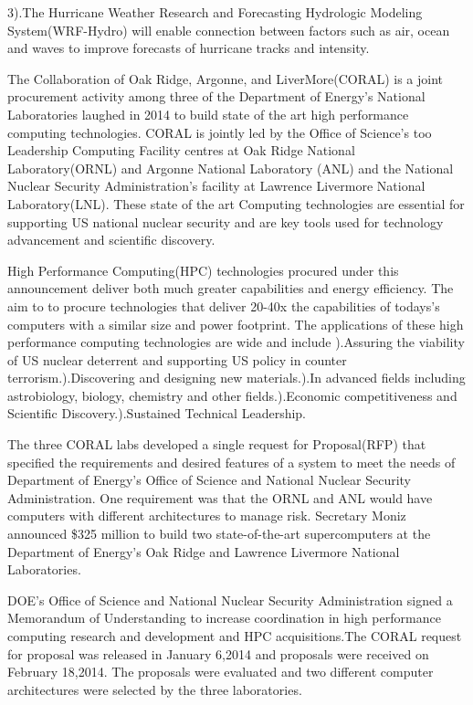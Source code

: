 \documentclass[fleqn,letterpaper,12pt]{report}
\begin{document}
3).The Hurricane Weather Research and Forecasting Hydrologic Modeling System(WRF-Hydro) will enable connection between factors such as air, ocean and waves to improve forecasts of hurricane tracks and intensity.
%
\newpage
{}
{}
\problem
The Collaboration of Oak Ridge, Argonne, and LiverMore(CORAL) is a joint procurement activity among three of the Department of Energy’s National Laboratories laughed in 2014 to build state of the art high performance computing technologies. CORAL is jointly led by the Office of Science’s too Leadership Computing Facility centres at Oak Ridge National Laboratory(ORNL) and Argonne  National Laboratory (ANL) and the National Nuclear Security Administration’s facility at Lawrence Livermore National Laboratory(LNL). These state of the art Computing technologies are essential for supporting US national nuclear security and are key tools used for technology advancement and scientific discovery.

High Performance Computing(HPC) technologies procured under this announcement deliver both much greater capabilities and energy efficiency. The aim to to procure technologies that deliver 20-40x the capabilities of todays’s computers with a similar size and power footprint. The applications of these high performance computing technologies are wide and include ).Assuring the viability of US nuclear deterrent and supporting US policy in counter terrorism.).Discovering and designing new materials.).In advanced fields including astrobiology, biology, chemistry and other fields.).Economic competitiveness and Scientific Discovery.).Sustained Technical Leadership.

The three CORAL labs developed a single request for Proposal(RFP) that specified the requirements and desired features of a system to meet the needs of Department of Energy’s Office of Science and National Nuclear Security Administration. One requirement was that the ORNL and ANL would have computers with different architectures to manage risk. Secretary Moniz announced \$325 million to build two state-of-the-art supercomputers at the Department of Energy’s Oak Ridge and Lawrence Livermore National Laboratories.\cite{ORL}

DOE’s Office of Science and National Nuclear Security Administration signed a Memorandum of Understanding to increase coordination in high performance computing research and development and HPC acquisitions.The CORAL request for proposal was released in January 6,2014 and proposals were received on February 18,2014. The proposals were evaluated and two different computer architectures were selected by the three laboratories.\cite{DOE} \cite{IBM}
\end{document}
